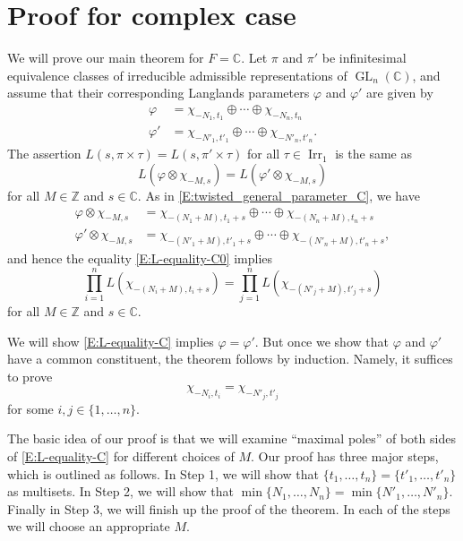 \documentclass[11pt]{amsart}
\theoremstyle{plain}
\theoremstyle{definition}
\numberwithin{equation}{section}
\newcommand{\C}{\mathbb C}
\newcommand{\Z}{\mathbb{Z}}
\newcommand{\Irr}{\operatorname{Irr}}
\newcommand{\GL}{\operatorname{GL}}
\begin{document}

\section{Proof for complex case}



We will prove our main theorem for $F=\C$. Let $\pi$ and $\pi'$ be
infinitesimal equivalence classes of irreducible admissible
representations of $\GL_n(\C)$, and assume that their corresponding
Langlands parameters $\varphi$ and $\varphi'$ are given by
\begin{align*}
\varphi&=\chi_{-N_1,t_1}\oplus\cdots\oplus\chi_{-N_n, t_n}\\
\varphi'&=\chi_{-N'_1,t'_1}\oplus\cdots\oplus\chi_{-N'_n, t'_n}.
\end{align*}
The assertion $L(s, \pi\times\tau)=L(s, \pi'\times\tau)$ for all
$\tau\in\Irr_1$ is the same as
\begin{equation}\label{E:L-equality-C0}
L(\varphi\otimes\chi_{-M, s})=L(\varphi'\otimes\chi_{-M, s})
\end{equation}
for all $M\in\Z$ and $s\in\C$. As in
\eqref{E:twisted_general_parameter_C}, we have
\begin{align*}
\varphi\otimes\chi_{-M,s}&=\chi_{-(N_1+M),t_1+s}\oplus\cdots\oplus\chi_{-(N_n+M), t_n+s}\\
\varphi'\otimes\chi_{-M,s}&
=\chi_{-(N'_1+M),t'_1+s}\oplus\cdots\oplus\chi_{-(N'_n+M),t'_n+s},
\end{align*}
and hence the equality \eqref{E:L-equality-C0} implies
\begin{equation}\label{E:L-equality-C}
\prod_{i=1}^nL(\chi_{-(N_i+M),t_i+s})
=\prod_{j=1}^nL(\chi_{-(N'_j+M),t'_j+s})
\end{equation}
for all $M\in\Z$ and $s\in\C$.

We will show \eqref{E:L-equality-C} implies $\varphi=\varphi'$. But
once we show that $\varphi$ and $\varphi'$ have
a common constituent, the theorem follows by induction. Namely, it
suffices to prove
\begin{equation}\label{E:goal}
\chi_{-N_i, t_i}=\chi_{-N'_j, t'_j}
\end{equation}
for some $i, j\in\{1,\dots,n\}$.


The basic idea of our proof is that we will examine ``maximal poles'' of
both sides of \eqref{E:L-equality-C} for
different choices of $M$. Our proof has three major steps, which is
outlined as follows. In Step 1, we will show that $\{t_1,\dots, t_n\}=\{t'_1,\dots,
t'_n\}$ as multisets. In Step 2, we will show that
$\min\{N_1,\dots,N_n\}=\min\{N'_1,\dots,N'_n\}$. Finally in Step 3, we
will finish up the proof of the theorem. In each of the steps we
will choose an appropriate $M$.
\end{document}
